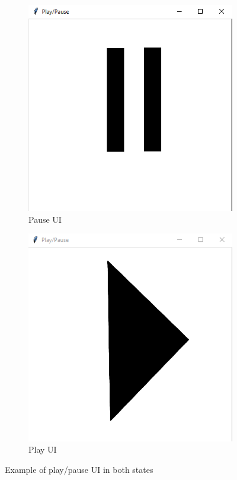 \documentclass[10pt,a4paper]{report}
\begin{document}
\begin{figure}
	\centering
	\begin{subfigure}[b]{0.3\textwidth}
		\centering
		\includegraphics[width=\textwidth]{PauseEx}
		\caption{Pause UI}
		\label{fig:pauseEx}
	\end{subfigure}
	\hfill
	\begin{subfigure}[b]{0.3\textwidth}
		\centering
		\includegraphics[width=\textwidth]{PlayEx}
		\caption{Play UI}
		\label{fig:playEx}
	\end{subfigure}
	\caption{Example of play/pause UI in both states}
	\label{fig:PPUI}
\end{figure}
\end{document}
